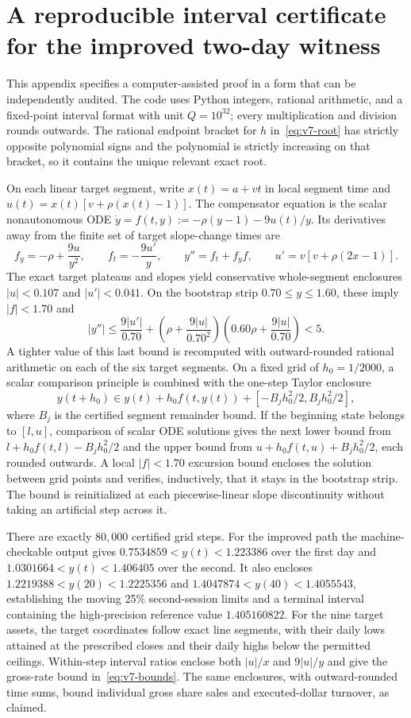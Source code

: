 \documentclass[review,hidelinks,onefignum,onetabnum]{siamonline250211}
\begin{document}
\section{A reproducible interval certificate for the improved two-day witness}\label{app:v7certificate}
This appendix specifies a computer-assisted proof in a form that can be independently audited. The code  uses Python integers, rational arithmetic, and a fixed-point interval format with unit $Q=10^{32}$; every multiplication and division rounds outwards. The rational endpoint bracket for $h$ in~\eqref{eq:v7-root} has strictly opposite polynomial signs and the polynomial is strictly increasing on that bracket, so it contains the unique relevant exact root.

On each linear target segment, write $x(t)=a+vt$ in local segment time and $u(t)=x(t)[v+\rho(x(t)-1)]$. The compensator equation is the scalar nonautonomous ODE $\dot y=f(t,y):=-\rho(y-1)-9u(t)/y$. Its derivatives away from the finite set of target slope-change times are
\[
f_y=-\rho+\frac{9u}{y^2},\qquad f_t=-\frac{9u'}y,\qquad
 y''=f_t+f_y f,\qquad u'=v[v+\rho(2x-1)].
\]
The exact target plateaus and slopes yield conservative whole-segment enclosures $|u|<0.107$ and $|u'|<0.041$. On the bootstrap strip $0.70\le y\le1.60$, these imply $|f|<1.70$ and
\[
|y''|\le\frac{9|u'|}{0.70}
+\left(\rho+\frac{9|u|}{0.70^2}\right)
\left(0.60\rho+\frac{9|u|}{0.70}\right)<5.
\]
A tighter value of this last bound is recomputed with outward-rounded rational arithmetic on each of the six target segments. On a fixed grid of $h_0=1/2000$, a scalar comparison principle is combined with the one-step Taylor enclosure
\[
 y(t+h_0)\in y(t)+h_0 f(t,y(t))+[-B_j h_0^2/2,B_j h_0^2/2],
\]
where $B_j$ is the certified segment remainder bound. If the beginning state belongs to $[l,u]$, comparison of scalar ODE solutions gives the next lower bound from $l+h_0 f(t,l)-B_jh_0^2/2$ and the upper bound from $u+h_0 f(t,u)+B_jh_0^2/2$, each rounded outwards. A local $|f|<1.70$ excursion bound encloses the solution between grid points and verifies, inductively, that it stays in the bootstrap strip. The bound is reinitialized at each piecewise-linear slope discontinuity without taking an artificial step across it.

There are exactly $80,000$ certified grid steps. For the improved path the machine-checkable output gives $0.7534859<y(t)<1.223386$ over the first day and $1.0301664<y(t)<1.406405$ over the second. It also encloses $1.2219388<y(20)<1.2225356$ and
$1.4047874<y(40)<1.4055543$, establishing the moving 25\% second-session limits and a terminal interval containing the high-precision reference value $1.405160822$. For the nine target assets, the target coordinates follow exact line segments, with their daily lows attained at the prescribed closes and their daily highs below the permitted ceilings. Within-step interval ratios enclose both $|u|/x$ and $9|u|/y$ and give the gross-rate bound in~\eqref{eq:v7-bounds}. The same enclosures, with outward-rounded time sums, bound individual gross share sales and executed-dollar turnover, as claimed.
\end{document}
